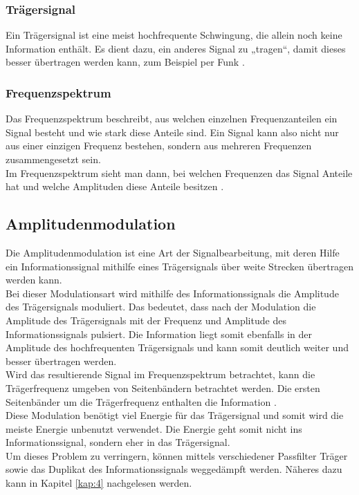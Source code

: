 \documentclass[12pt]{scrartcl}
\begin{document}
\subsubsection*{Trägersignal}
Ein Trägersignal ist eine meist hochfrequente Schwingung, die allein noch keine Information enthält. 
Es dient dazu, ein anderes Signal zu „tragen“, damit dieses besser übertragen werden kann, zum Beispiel per Funk \cite{GoldenbaumGitskript}.

\subsubsection*{Frequenzspektrum}
Das Frequenzspektrum beschreibt, aus welchen einzelnen Frequenzanteilen ein Signal besteht und wie stark diese Anteile sind.
Ein Signal kann also nicht nur aus einer einzigen Frequenz bestehen, sondern aus mehreren Frequenzen zusammengesetzt sein.\\ 
Im Frequenzspektrum sieht man dann, bei welchen Frequenzen das Signal Anteile hat und welche Amplituden diese Anteile besitzen \cite{GoldenbaumGitskript}.


\subsection{Amplitudenmodulation}
Die Amplitudenmodulation ist eine Art der Signalbearbeitung, mit deren Hilfe ein Informationssignal mithilfe eines Trägersignals über weite Strecken übertragen werden kann.\\
Bei dieser Modulationsart wird mithilfe des Informationssignals die Amplitude des Trägersignals moduliert.
Das bedeutet, dass nach der Modulation die Amplitude des Trägersignals mit der Frequenz und Amplitude des Informationssignals pulsiert.
Die Information liegt somit ebenfalls in der Amplitude des hochfrequenten Trägersignals und kann somit deutlich weiter und besser übertragen werden.\\
Wird das resultierende Signal im Frequenzspektrum betrachtet, kann die Trägerfrequenz umgeben von Seitenbändern betrachtet werden. 
Die ersten Seitenbänder um die Trägerfrequenz enthalten die Information \cite{GoldenbaumGitskript}.\\
Diese Modulation benötigt viel Energie für das Trägersignal und somit wird die meiste Energie unbenutzt verwendet. 
Die Energie geht somit nicht ins Informationssignal, sondern eher in das Trägersignal.\\
Um dieses Problem zu verringern, können mittels verschiedener Passfilter Träger sowie das Duplikat des Informationssignals weggedämpft werden. 
Näheres dazu kann in Kapitel \ref{kap:4} nachgelesen werden. 
\end{document}
